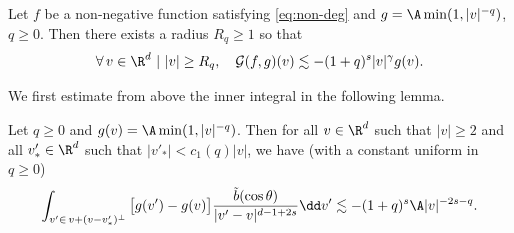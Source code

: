 
\begin{prop} \label{prop:G-bis} Let $f$ be a non-negative function satisfying \eqref{eq:non-deg} and
$g = \A \min(1,|v|^{-q})$, $q \ge 0$. Then there exists a radius
$R_q \geq 1$ so that
\[ \forall \, v \in \R^d \ | \ |v| \geq R_q, \quad
\mathcal{G}(f,g)(v) \lesssim - (1+q)^s |v|^{\gamma} g(v). \]
\end{prop}

We first estimate from above the inner integral in the following lemma.
\begin{lemma} \label{l:good-cone} Let $q \geq 0$ and
$g (v) = \A \min(1,|v|^{-q})$. Then for all $v \in \R^d$ such that
$|v| \ge 2$ and all $v'_* \in \R^d$ such that $|v'_*| < c_1(q)|v|$,
we have (with a constant uniform in $q \ge 0$)
\[
\int_{v'\in \, v + (v-v'_*)^\bot} \big[ g(v') - g(v)\big] \frac{\tilde
b(\cos \theta)}{|v'-v|^{d-1+2s}} \dd v' \lesssim - (1+q)^s \A
|v|^{-2s-q}.
\]
\end{lemma}

